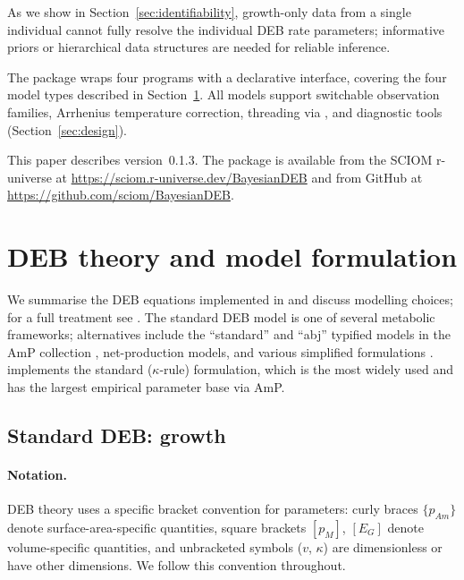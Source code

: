 \documentclass[article,shortnames]{jss}
\newcommand{\pAm}{\{p_{Am}\}}
\newcommand{\pM}{[p_M]}
\newcommand{\EG}{[E_G]}
\begin{document}
As we show in Section~\ref{sec:identifiability}, growth-only data
from a single individual cannot fully resolve the individual DEB
rate parameters; informative priors or hierarchical data
structures are needed for reliable inference.

The  package wraps four 
\citep{CarpenterStan2017} programs with a declarative 
interface, covering the four model types described in
Section~\ref{sec:theory}.  All models support switchable
observation families, Arrhenius temperature correction,
threading via , and diagnostic tools
(Section~\ref{sec:design}).

This paper describes  version~0.1.3.  The package is
available from the SCIOM r-universe at
\url{https://sciom.r-universe.dev/BayesianDEB} and from GitHub
at \url{https://github.com/sciom/BayesianDEB}.


\section{DEB theory and model formulation} \label{sec:theory}

We summarise the DEB equations implemented in  and
discuss modelling choices; for a full treatment see
\citet{Kooijman2010}.  The standard DEB model is one of several
metabolic frameworks; alternatives include the ``standard'' and
``abj'' typified models in the AmP collection \citep{MarquesAmP2018},
net-production models, and various simplified formulations
\citep{JagerZimmer2012}.   implements the standard
($\kappa$-rule) formulation, which is the most widely used and has the
largest empirical parameter base via AmP.

\subsection{Standard DEB: growth} \label{sec:growth}

\paragraph{Notation.}
DEB theory uses a specific bracket convention for parameters:
curly braces $\pAm$ denote surface-area-specific quantities,
square brackets $\pM$, $\EG$ denote volume-specific quantities,
and unbracketed symbols ($v$, $\kappa$) are dimensionless or have
other dimensions.  We follow this convention throughout.
\end{document}
